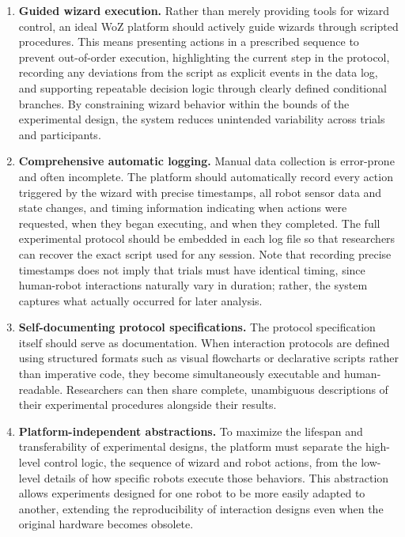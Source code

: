 \begin{enumerate}
\item \textbf{Guided wizard execution.} Rather than merely providing tools for wizard control, an ideal WoZ platform should actively guide wizards through scripted procedures. This means presenting actions in a prescribed sequence to prevent out-of-order execution, highlighting the current step in the protocol, recording any deviations from the script as explicit events in the data log, and supporting repeatable decision logic through clearly defined conditional branches. By constraining wizard behavior within the bounds of the experimental design, the system reduces unintended variability across trials and participants.

\item \textbf{Comprehensive automatic logging.} Manual data collection is error-prone and often incomplete. The platform should automatically record every action triggered by the wizard with precise timestamps, all robot sensor data and state changes, and timing information indicating when actions were requested, when they began executing, and when they completed. The full experimental protocol should be embedded in each log file so that researchers can recover the exact script used for any session. Note that recording precise timestamps does not imply that trials must have identical timing, since human-robot interactions naturally vary in duration; rather, the system captures what actually occurred for later analysis.

\item \textbf{Self-documenting protocol specifications.} The protocol specification itself should serve as documentation. When interaction protocols are defined using structured formats such as visual flowcharts or declarative scripts rather than imperative code, they become simultaneously executable and human-readable. Researchers can then share complete, unambiguous descriptions of their experimental procedures alongside their results.

\item \textbf{Platform-independent abstractions.} To maximize the lifespan and transferability of experimental designs, the platform must separate the high-level control logic, the sequence of wizard and robot actions, from the low-level details of how specific robots execute those behaviors. This abstraction allows experiments designed for one robot to be more easily adapted to another, extending the reproducibility of interaction designs even when the original hardware becomes obsolete.
\end{enumerate}



